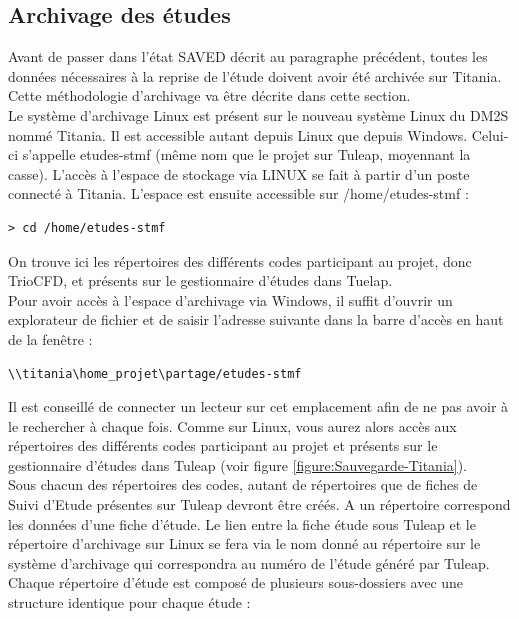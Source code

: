 \subsection{Archivage des études}
Avant de passer dans l'état SAVED décrit au paragraphe précédent, toutes les données nécessaires à la reprise de l'étude doivent avoir été archivée sur Titania. Cette méthodologie d'archivage va être décrite dans cette section.\\

Le système d'archivage Linux est présent sur le nouveau système Linux du DM2S nommé Titania. Il est accessible autant depuis Linux que depuis Windows. Celui-ci s'appelle etudes-stmf (même nom que le projet sur Tuleap, moyennant la casse). L'accès à l'espace de stockage via LINUX se fait à partir d'un poste connecté à Titania. L'espace est ensuite accessible sur /home/etudes-stmf :
\begin{lstlisting}
> cd /home/etudes-stmf 
\end{lstlisting}
On trouve ici les répertoires des différents codes participant au projet, donc TrioCFD, et présents sur le gestionnaire d'études dans Tuelap.\\
Pour avoir accès à l'espace d'archivage via Windows, il suffit d'ouvrir un explorateur de fichier et de saisir l'adresse suivante dans la barre d'accès en haut de la fenêtre :
\begin{lstlisting}
\\titania\home_projet\partage/etudes-stmf
\end{lstlisting}
Il est conseillé de connecter un lecteur sur cet emplacement afin de ne pas avoir à le rechercher à chaque fois. Comme sur Linux, vous aurez alors accès aux répertoires des différents codes participant au projet et présents sur le gestionnaire d'études dans Tuleap (voir figure \ref{figure:Sauvegarde-Titania}).\\
Sous chacun des répertoires des codes, autant de répertoires que de fiches de Suivi d'Etude présentes sur Tuleap devront être créés. A un répertoire correspond les données d'une fiche d'étude. Le lien entre la fiche étude sous Tuleap et le répertoire d'archivage sur Linux se fera via le nom donné au répertoire sur le système d'archivage qui correspondra au numéro de l'étude généré par Tuleap. Chaque répertoire d'étude est composé de plusieurs sous-dossiers avec une structure identique pour chaque étude :
